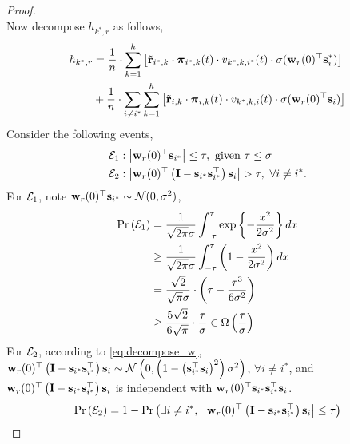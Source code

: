 \documentclass[10pt]{article}
\begin{document}
\begin{proof}
\begin{equation*}
\end{equation*}
Now decompose $h_{k^*,r}$ as follows,
\begin{equation}
\label{eq:decompose_h}
\begin{split}
	h_{k^*,r} &= \frac{1}{n} \cdot \sum\limits_{k=1}^{h}{ \left[ {\tilde{\mathbf{r}}}_{i^*,k} \cdot {\boldsymbol{\pi}}_{i^*,k}(t) \cdot v_{k^*,k,i^*}(t) \cdot \sigma( {\mathbf{w}}_r(0)^\top {\mathbf{s}}_i^* ) \right] } \\
	&+ \frac{1}{n} \cdot \sum\limits_{i \not= i^*}{\sum\limits_{k=1}^{h}{ \left[ {\tilde{\mathbf{r}}}_{i,k} \cdot {\boldsymbol{\pi}}_{i,k}(t) \cdot v_{k^*,k,i}(t) \cdot \sigma( {\mathbf{w}}_r(0)^\top {\mathbf{s}}_i ) \right] } }
\end{split}
\end{equation}
Consider the following events,
\begin{equation*}
\begin{split}
	\gE_1 &: \left| \rvw_r(0)^\top \rvs_{i^*} \right| \le \tau, \ \text{given } \tau \le \sigma \\
	\gE_2 &: \left| \rvw_r(0)^\top \left( \rmI - \rvs_{i^*}\rvs_{i^*}^\top \right) \rvs_i \right| > \tau, \ \forall i \not= i^*.
\end{split}
\end{equation*}
For ${\mathcal{E}}_1$, note ${\mathbf{w}}_r(0)^\top {\mathbf{s}}_{i^*} \sim {\mathcal{N}}(0, \sigma^2)$,
\begin{equation*}
\begin{split}
	{\text{Pr}}\left({\mathcal{E}}_1\right) &= \frac{1}{\sqrt{2\pi}\sigma} \int_{-\tau}^{\tau}{\exp\left\{ - \frac{x^2}{2\sigma^2} \right\} dx} \\
	&\ge \frac{1}{\sqrt{2\pi}\sigma} \int_{-\tau}^{\tau}{ \left( 1  - \frac{x^2}{2\sigma^2} \right) dx} \\
	&= \frac{\sqrt{2}}{\sqrt{\pi}\sigma} \cdot \left( \tau - \frac{\tau^3}{6\sigma^2}\right) \\
	&\ge \frac{5\sqrt{2}}{6\sqrt{\pi}} \cdot \frac{\tau}{\sigma} \in \Omega\left( \frac{\tau}{\sigma} \right)
\end{split}
\end{equation*}
For ${\mathcal{E}}_2$, according to \cref{eq:decompose_w}, ${\mathbf{w}}_r(0)^\top \left( {\mathbf{I}} - {\mathbf{s}}_{i^*}{\mathbf{s}}_{i^*}^\top \right) {\mathbf{s}}_i \sim {\mathcal{N}}\left(0, \left(1 - \left({\mathbf{s}}_{i^*}^\top {\mathbf{s}}_{i} \right)^2 \right)\sigma^2 \right)$, $\forall i \not= i^*$, and ${\mathbf{w}}_r(0)^\top \left( {\mathbf{I}} - {\mathbf{s}}_{i^*}{\mathbf{s}}_{i^*}^\top \right) {\mathbf{s}}_i$ is independent with ${\mathbf{w}}_r(0)^\top {\mathbf{s}}_{i^*} {\mathbf{s}}_{i^*}^\top {\mathbf{s}}_{i}$.
\begin{equation*}
\begin{split}
	\pr\left(\gE_2\right) &= 1 - \pr\left( \exists i \not= i^*, \ \left| \rvw_r(0)^\top \left( \rmI - \rvs_{i^*}\rvs_{i^*}^\top \right) \rvs_i \right| \le \tau \right) \\

\end{split}
\end{equation*}
\end{proof}
\end{document}
